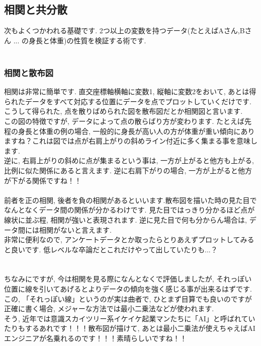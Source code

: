 \documentclass[11pt,a4paper]{jreport}
\begin{document}
\subsection{相関と共分散}
次もよくつかわれる基礎です. 2つ以上の変数を持つデータ(たとえばAさん,Bさん ... の身長と体重)の性質を検証する術です. \\
\\
\subsubsection{相関と散布図}
相関は非常に簡単です. 直交座標軸横軸に変数1, 縦軸に変数2をおいて, あとは得られたデータをすべて対応する位置にデータを点でプロットしていくだけです. こうして得られた, 点を散りばめられた図を散布図だとか相関図と言います.\\
この図の特徴ですが, データによって点の散らばり方が変わります. たとえば先程の身長と体重の例の場合, 一般的に身長が高い人の方が体重が重い傾向にありますね？これは図では点が右肩上がりの斜めライン付近に多く集まる事を意味します. \\
逆に, 右肩上がりの斜めに点が集まるという事は, 一方が上がると他方も上がる, 比例に似た関係にあると言えます. 逆に右肩下がりの場合, 一方が上がると他方が下がる関係ですね！！\\
\\
前者を正の相関, 後者を負の相関があるといいます.散布図を描いた時の見た目でなんとなくデータ間の関係が分かるわけです. 見た目ではっきり分かるほど点が線状に並ぶ程, 相関が強いと表現されます. 逆に見た目で何も分からん場合は, データ間には相関がないと言えます. \\
非常に便利なので, アンケートデータとか取ったらとりあえずプロットしてみると良いです. 低レベルな卒論だとこれだけやって出していたりも...？\\
\\
\\
ちなみにですが, 今は相関を見る際になんとなくで評価しましたが, それっぽい位置に線を引いてあげるとよりデータの傾向を強く感じる事が出来るはずです. この, 「それっぽい線」というのが実は曲者で, ひとまず目算でも良いのですが正確に書く場合, メジャーな方法では最小二乗法などが使われます. \\
そう, 近年では意識スカイツリー系イケイケ起業マンたちに「AI」と呼ばれていたりもするあれです！！！散布図が描けて, あとは最小二乗法が使えちゃえばAIエンジニアが名乗れるのです！！！素晴らしいですね！！\\
\end{document}
